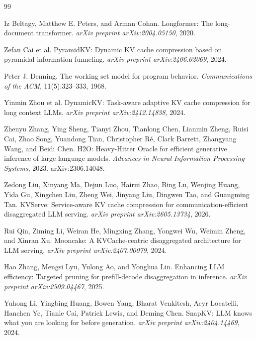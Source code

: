 \documentclass[11pt]{article}
\theoremstyle{definition}
\theoremstyle{plain}
\begin{document}
\begin{thebibliography}{99}

Iz Beltagy, Matthew E. Peters, and Arman Cohan.
\newblock Longformer: The long-document transformer.
\newblock \emph{arXiv preprint arXiv:2004.05150}, 2020.

Zefan Cai et al.
\newblock PyramidKV: Dynamic KV cache compression based on pyramidal information funneling.
\newblock \emph{arXiv preprint arXiv:2406.02069}, 2024.

Peter J. Denning.
\newblock The working set model for program behavior.
\newblock \emph{Communications of the ACM}, 11(5):323--333, 1968.

Yinmin Zhou et al.
\newblock DynamicKV: Task-aware adaptive KV cache compression for long context LLMs.
\newblock \emph{arXiv preprint arXiv:2412.14838}, 2024.

Zhenyu Zhang, Ying Sheng, Tianyi Zhou, Tianlong Chen, Lianmin Zheng, Ruisi Cai, Zhao Song, Yuandong Tian, Christopher R\'{e}, Clark Barrett, Zhangyang Wang, and Beidi Chen.
\newblock H2O: Heavy-Hitter Oracle for efficient generative inference of large language models.
\newblock \emph{Advances in Neural Information Processing Systems}, 2023. arXiv:2306.14048.

Zedong Liu, Xinyang Ma, Dejun Luo, Hairui Zhao, Bing Lu, Wenjing Huang, Yida Gu, Xingchen Liu, Zheng Wei, Jinyang Liu, Dingwen Tao, and Guangming Tan.
\newblock KVServe: Service-aware KV cache compression for communication-efficient disaggregated LLM serving.
\newblock \emph{arXiv preprint arXiv:2605.13734}, 2026.

Rui Qin, Ziming Li, Weiran He, Mingxing Zhang, Yongwei Wu, Weimin Zheng, and Xinran Xu.
\newblock Mooncake: A KVCache-centric disaggregated architecture for LLM serving.
\newblock \emph{arXiv preprint arXiv:2407.00079}, 2024.

Hao Zhang, Mengsi Lyu, Yulong Ao, and Yonghua Lin.
\newblock Enhancing LLM efficiency: Targeted pruning for prefill-decode disaggregation in inference.
\newblock \emph{arXiv preprint arXiv:2509.04467}, 2025.

Yuhong Li, Yingbing Huang, Bowen Yang, Bharat Venkitesh, Acyr Locatelli, Hanchen Ye, Tianle Cai, Patrick Lewis, and Deming Chen.
\newblock SnapKV: LLM knows what you are looking for before generation.
\newblock \emph{arXiv preprint arXiv:2404.14469}, 2024.


\end{thebibliography}
\end{document}
